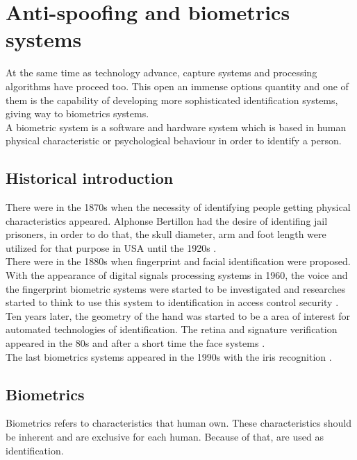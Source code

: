 \section{Anti-spoofing and biometrics systems}
At the same time as technology advance, capture systems and processing algorithms have proceed too. This open an immense options quantity and one of them is the capability of developing more sophisticated identification systems, giving way to biometrics systems.\\

A biometric system is a software and hardware system which is based in human physical characteristic or psychological behaviour in order to identify a person.\\

\subsection{Historical introduction}
There were in the 1870s when the necessity of identifying people getting physical characteristics appeared. Alphonse Bertillon had the desire of identifing jail prisoners, in order to do that, the skull diameter, arm and foot length were utilized for that purpose in USA until the 1920s \cite{Intro_biometrics}.\\

There were in the 1880s when fingerprint and facial identification were proposed. With the appearance of digital signals processing systems in 1960, the voice and the fingerprint biometric systems were started to be investigated and researches started to think to use this system to identification in access control security \cite{Intro_biometrics}.\\
 
Ten years later, the geometry of the hand was started to be a area of interest for automated technologies of identification. The retina and signature verification appeared in the 80s and after a short time the face systems \cite{Intro_biometrics}.\\

The last biometrics systems appeared in the 1990s with the iris recognition \cite{Intro_biometrics}.\\

\subsection{Biometrics}
Biometrics refers to characteristics that human own. These characteristics should be inherent and are exclusive for each human. Because of that, are used as identification.\\

